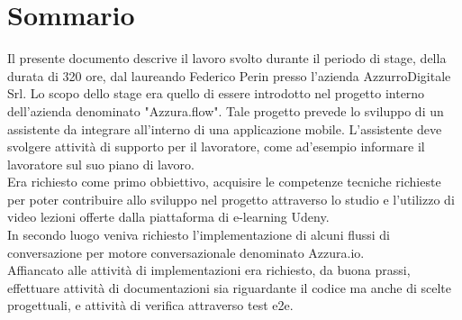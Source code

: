 
\cleardoublepage
{}
{}
\begingroup
\let\clearpage\relax
\let\cleardoublepage\relax
\let\cleardoublepage\relax

\chapter*{Sommario}

Il presente documento descrive il lavoro svolto durante il periodo di stage, della durata di 320 ore, dal laureando Federico Perin presso l'azienda AzzurroDigitale Srl.
Lo scopo dello stage era quello di essere introdotto nel progetto interno dell'azienda denominato "Azzura.flow". Tale progetto prevede lo sviluppo di un assistente da integrare all'interno di una applicazione mobile. L'assistente deve svolgere attività di supporto per il lavoratore, come ad'esempio informare il lavoratore sul suo piano di lavoro. \\
 Era richiesto come primo obbiettivo, acquisire le competenze tecniche richieste per poter contribuire allo sviluppo nel progetto attraverso lo studio e l'utilizzo di video lezioni offerte dalla piattaforma di e-learning Udeny.\\
  In secondo luogo veniva richiesto l'implementazione di alcuni flussi di conversazione per motore conversazionale denominato Azzura.io.\\
   Affiancato alle attività di implementazioni era richiesto, da buona prassi, effettuare attività di documentazioni sia riguardante il codice ma anche di scelte progettuali, e attività di verifica attraverso test e2e. 




%
%

\endgroup			

\vfill

